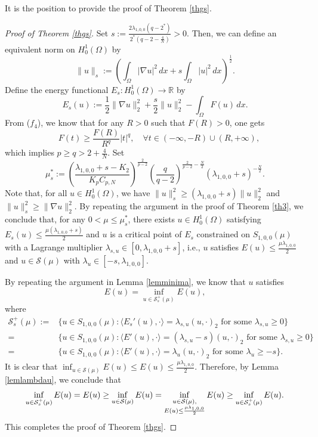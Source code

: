 \documentclass[11pt]{amsart}
\newcommand{\abs}[1]{\lvert#1\rvert}
\newcommand{\norm}[1]{\lVert#1\rVert}
\newcommand{\E}{\mathrm{E}}
\newcommand{\R}{\mathbb{R}}
\numberwithin{equation}{section}
\begin{document}
It is the position to provide the proof of Theorem \ref{thgs}.
\begin{proof}[Proof of Theorem \ref{thgs}]
Set $s := \frac{2\lambda_{1,0,0}(q-2^*)}{2^*(q-2-\frac{4}{N})}>0$. Then, we can define an equivalent norm on $H_0^1(\Omega)$ by
$$
\|u\|_s:=\left(\int_{\Omega}|\nabla u|^2\,dx+s \int_{ \Omega}|u|^2\,dx\right)^{\frac{1}{2}}.
$$ Define the energy functional $E_s : H_0^1(\Omega)\to \R$ by
$$
E_s(u):=\frac{1}{2}\norm{\nabla u}_2^2 +\frac{s}{2}\norm{u}_2^2-\int_{\Omega}F(u)\, dx.
$$
From ($f_4$),  we know that for any $R>0$ such that $F(R)>0$, one gets
$$
\quad F(t)\geq \frac{F(R)}{R^q} \abs{t}^q, \quad \forall t\in (-\infty,-R)\cup(R,+\infty),
$$
which implies $p \geq q >2+\frac{4}{N}$. Set
\begin{equation}\label{eqmus}
    \mu^*_s:=
    \left(\frac{\lambda_{1,0,0}+s-K_2}{K_pC_{p,N}}\right)^{\frac{2}{p-2}}\left(\frac{q}{q-2}\right)^{{\frac{2}{p-2}}-\frac{N}{2}}(\lambda_{1,0,0}+s)^{-\frac{N}{2}}.
\end{equation}
Note that, for all $u \in H_0^1(\Omega)$, we have $\norm{u}^2_s \geq (\lambda_{1,0,0}+s)\norm{u}^2_2$ and $\norm{u}^2_s \geq \norm{\nabla u}^2_2$.
By repeating the argument in the proof of Theorem \ref{th3}, we conclude that, for any $0<\mu\leq \mu^*_s$, there exists $u\in H_0^1(\Omega) $ satisfying $E_s(u) \leq \frac{\mu(\lambda_{1,0,0}+s)}{2}$ and $u$ is a critical point of $E_s$ constrained on $S_{1,0,0}(\mu)$ with a Lagrange multiplier $\lambda_{s,u} \in [0,\lambda_{1,0,0}+s]$, i.e., $u$ satisfies $E(u) \leq \frac{\mu\lambda_{1,0,0}}{2}$ and $u \in \mathcal{S}(\mu)$ with $\lambda_u \in [-s,\lambda_{1,0,0}]$.

By repeating the argument in Lemma \ref{lemminima}, we know that $u$ satisfies
$$E(u)= \inf_{u \in \mathcal{S}_s^+(\mu)}E(u),$$
where
$$
\begin{aligned}
    \mathcal{S}_s^+(\mu):=&\{u \in S_{1,0,0}(\mu):\langle E_s'(u),\cdot \rangle=\lambda_{s,u} (u,\cdot)_2\text{ for some } \lambda_{s,u} \geq 0 \} \\=& \{u \in S_{1,0,0}(\mu):\langle E'(u),\cdot \rangle=(\lambda_{s,u}-s) (u,\cdot)_2\text{ for some } \lambda_{s,u} \geq 0 \}
    \\=&\{u \in S_{1,0,0}(\mu):\langle E'(u),\cdot \rangle=\lambda_u (u,\cdot)_2\text{ for some } \lambda_{u} \geq -s \}.
\end{aligned}
$$
It is clear that $\displaystyle \inf_{u \in \mathcal{S}(\mu)}E(u)\leq E(u)\leq \frac{\mu\lambda_{1,0,0}}{2}$. Therefore, by Lemma \ref{lemlambdau}, we conclude that
$$
\inf_{u \in\mathcal{S}_s^+(\mu)}E(u) =E(u)\geq \inf_{u \in \mathcal{S}(\mu)}E(u)=\inf_{\begin{subarray}{c}u \in \mathcal{S}(\mu),\\E(u)\leq \frac{\mu\lambda_{1,0,0}}{2}\end{subarray}}E(u)\geq \inf_{u \in\mathcal{S}_s^+(\mu)}E(u).
$$
This completes the proof of Theorem \ref{thgs}.
\end{proof}
\end{document}
